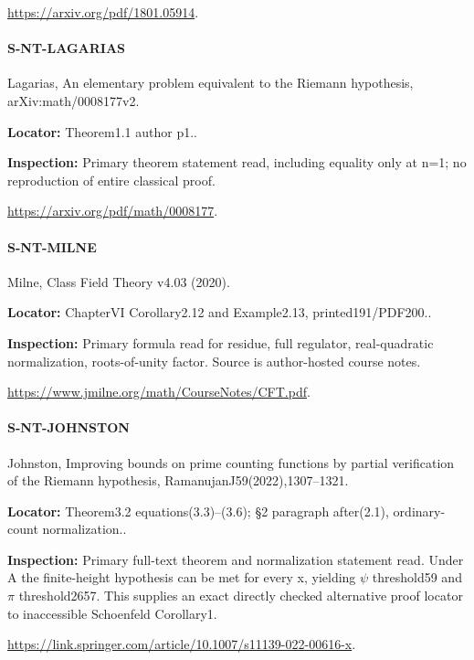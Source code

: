 \documentclass[11pt,a4paper]{article}
\begin{document}
\url{https://arxiv.org/pdf/1801.05914}.

\paragraph{S-NT-LAGARIAS} Lagarias, An elementary problem equivalent to the Riemann hypothesis, arXiv:\allowbreak{}math/\allowbreak{}0008177v2.

\textbf{Locator:} Theorem1.\allowbreak{}1 author p1.\allowbreak{}.

\textbf{Inspection:} Primary theorem statement read, including equality only at n=1; no reproduction of entire classical proof.\allowbreak{}

\url{https://arxiv.org/pdf/math/0008177}.

\paragraph{S-NT-MILNE} Milne, Class Field Theory v4.\allowbreak{}03 (2020).

\textbf{Locator:} ChapterVI Corollary2.\allowbreak{}12 and Example2.\allowbreak{}13, printed191/\allowbreak{}PDF200.\allowbreak{}.

\textbf{Inspection:} Primary formula read for residue, full regulator, real-quadratic normalization, roots-of-unity factor.\allowbreak{} Source is author-hosted course notes.\allowbreak{}

\url{https://www.jmilne.org/math/CourseNotes/CFT.pdf}.

\paragraph{S-NT-JOHNSTON} Johnston, Improving bounds on prime counting functions by partial verification of the Riemann hypothesis, RamanujanJ59(2022),1307–\allowbreak{}1321.

\textbf{Locator:} Theorem3.\allowbreak{}2 equations(3.\allowbreak{}3)–\allowbreak{}(3.\allowbreak{}6); §2 paragraph after(2.\allowbreak{}1), ordinary-count normalization.\allowbreak{}.

\textbf{Inspection:} Primary full-text theorem and normalization statement read.\allowbreak{} Under A the finite-height hypothesis can be met for every x, yielding \ensuremath{\psi} threshold59 and \ensuremath{\pi} threshold2657.\allowbreak{} This supplies an exact directly checked alternative proof locator to inaccessible Schoenfeld Corollary1.\allowbreak{}

\url{https://link.springer.com/article/10.1007/s11139-022-00616-x}.
\end{document}
